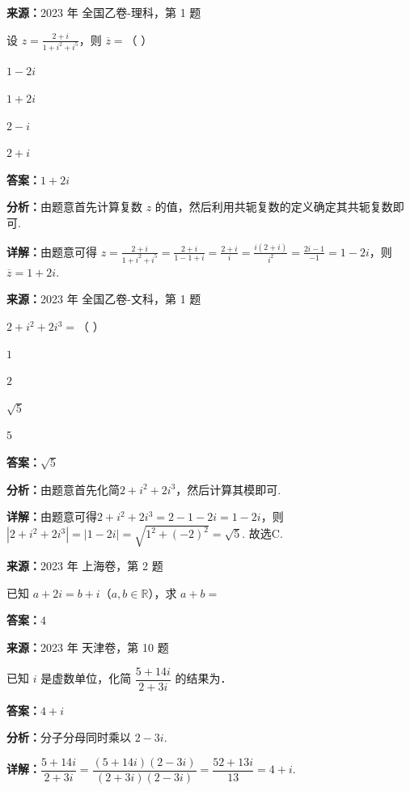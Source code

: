 \begin{question}[points=5]
\textbf{来源：}2023 年 全国乙卷-理科，第 1 题\par
设 $z=\frac{2+i}{1+i^{2}+i^{5}}$，则 $\overline{z}=$（ ）
\begin{choices}
  \item $1-2i$
  \item $1+2i$
  \item $2-i$
  \item $2+i$
\end{choices}
\begin{solution}
\textbf{答案：}$1+2i$

\textbf{分析：}由题意首先计算复数 $z$ 的值，然后利用共轭复数的定义确定其共轭复数即可.

\textbf{详解：}由题意可得 $z=\frac{2+i}{1+i^{2}+i^{5}}=\frac{2+i}{1-1+i}=\frac{2+i}{i}=\frac{i(2+i)}{i^{2}}=\frac{2i-1}{-1}=1-2i$，则 $\overline{z}=1+2i$.
\end{solution}
\end{question}

\begin{question}[points=5]
\textbf{来源：}2023 年 全国乙卷-文科，第 1 题\par
$2 + i^2 + 2i^3 =$（   ）
\begin{choices}
  \item $1$
  \item $2$
  \item $\sqrt{5}$
  \item $5$
\end{choices}
\begin{solution}
\textbf{答案：}$\sqrt{5}$

\textbf{分析：}由题意首先化简$2+i^2+2i^3$，然后计算其模即可.

\textbf{详解：}由题意可得$2+i^2+2i^3 = 2-1-2i = 1-2i$，则$|2+i^2+2i^3| = |1-2i| = \sqrt{1^2+(-2)^2} = \sqrt{5}$. 故选C.
\end{solution}
\end{question}

\begin{question}[points=4]
\textbf{来源：}2023 年 上海卷，第 2 题\par
已知 $a+2i=b+i$（$a,b\in \mathbb{R}$），求 $a+b=$
\fillin[{$4$}]
\begin{solution}
\textbf{答案：}$4$
\end{solution}
\end{question}

\begin{question}[points=5]
\textbf{来源：}2023 年 天津卷，第 10 题\par
已知 $i$ 是虚数单位，化简 $\dfrac{5 + 14i}{2 + 3i}$ 的结果为．
\fillin[{$4 + i$}]
\begin{solution}
\textbf{答案：}$4 + i$

\textbf{分析：}分子分母同时乘以 $2 - 3i$.

\textbf{详解：}$\dfrac{5 + 14i}{2 + 3i} = \dfrac{(5+14i)(2-3i)}{(2+3i)(2-3i)} = \dfrac{52 + 13i}{13} = 4 + i$.
\end{solution}
\end{question}

